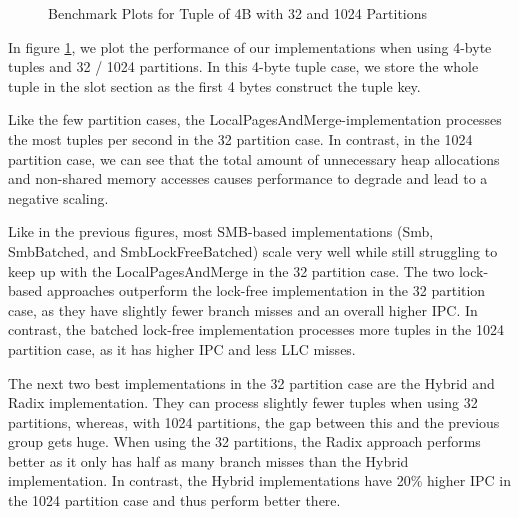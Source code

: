\begin{figure}[h]
  \centering
  \begin{subfigure}{.49\textwidth}
    \centering
    \resizebox{\linewidth}{!}{}
  \end{subfigure}
  \begin{subfigure}{.49\textwidth}
    \centering
    \resizebox{\linewidth}{!}{}
  \end{subfigure}
  \begin{subfigure}{\textwidth}
    \centering
    \resizebox{\linewidth}{!}{}
  \end{subfigure}
  \caption[Shuffle Benchmark Plots for Tuple of 4B with 32 and 1024 Partitions]{Benchmark Plots for Tuple of 4B with 32 and 1024 Partitions}
  \label{plot-shuffle-4B-32-1024}
\end{figure}

In figure \ref{plot-shuffle-4B-32-1024}, we plot the performance of our implementations when using 4-byte tuples and 32 / 1024 partitions.
In this 4-byte tuple case, we store the whole tuple in the slot section as the first 4 bytes construct the tuple key.

Like the few partition cases, the Local\-Pages\-And\-Merge-implementation processes the most tuples per second in the 32 partition case.
In contrast, in the 1024 partition case, we can see that the total amount of unnecessary heap allocations and non-shared memory accesses causes performance to degrade and lead to a negative scaling.

Like in the previous figures, most \ac{SMB}-based implementations (Smb, Smb\-Batched, and Smb\-Lock\-Free\-Batched) scale very well while still struggling to keep up with the Local\-Pages\-And\-Merge in the 32 partition case.
The two lock-based approaches outperform the lock-free implementation in the 32 partition case, as they have slightly fewer branch misses and an overall higher \ac{IPC}.
In contrast, the batched lock-free implementation processes more tuples in the 1024 partition case, as it has higher \ac{IPC} and less \ac{LLC} misses.

The next two best implementations in the 32 partition case are the Hybrid and Radix implementation.
They can process slightly fewer tuples when using 32 partitions, whereas, with 1024 partitions, the gap between this and the previous group gets huge.
When using the 32 partitions, the Radix approach performs better as it only has half as many branch misses than the Hybrid implementation.
In contrast, the Hybrid implementations have 20\% higher \ac{IPC} in the 1024 partition case and thus perform better there.

